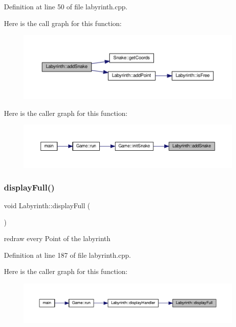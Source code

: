 Definition at line 50 of file labyrinth.\+cpp.

Here is the call graph for this function\+:
\nopagebreak
\begin{figure}[H]
\begin{center}
\leavevmode
\includegraphics[width=350pt]{class_labyrinth_ad2819aba76d079c7fda751e7388b7182_cgraph}
\end{center}
\end{figure}
Here is the caller graph for this function\+:
\nopagebreak
\begin{figure}[H]
\begin{center}
\leavevmode
\includegraphics[width=350pt]{class_labyrinth_ad2819aba76d079c7fda751e7388b7182_icgraph}
\end{center}
\end{figure}
\mbox{\label{class_labyrinth_a98447444cafe6d19e0e5c0181f3c1ddd}} 
\subsubsection{\texorpdfstring{displayFull()}{displayFull()}}
{\footnotesize\ttfamily void Labyrinth\+::display\+Full (\begin{DoxyParamCaption}{ }\end{DoxyParamCaption})\hspace{0.3cm}{\ttfamily [private]}}

redraw every Point of the labyrinth 

Definition at line 187 of file labyrinth.\+cpp.

Here is the caller graph for this function\+:
\nopagebreak
\begin{figure}[H]
\begin{center}
\leavevmode
\includegraphics[width=350pt]{class_labyrinth_a98447444cafe6d19e0e5c0181f3c1ddd_icgraph}
\end{center}
\end{figure}
\mbox{\label{class_labyrinth_a02c42abb1b58fdf8a20b66bddd0bbe00}} 

